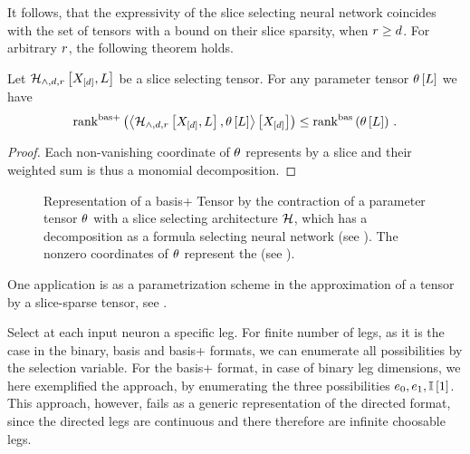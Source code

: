 It follows, that the expressivity of the slice selecting neural network coincides with the set of tensors with a bound on their slice sparsity, when $r\geq d$.
For arbitrary $r$, the following theorem holds.

\begin{theorem}
    Let $\mathcal{H}_{\land,d,r}\left[X_{[d]},L\right]$ be a slice selecting tensor.
    For any parameter tensor $\theta\left[L\right]$ we have
    \[ \mathrm{rank}^{\mathrm{bas+}}\left(\left\langle \mathcal{H}_{\land,d,r}\left[X_{[d]},L\right],\theta\left[L\right]\right\rangle \left[ X_{[d]} \right]\right) \leq \mathrm{rank}^{\mathrm{bas}}\left(\theta\left[L\right]\right) \, . \]
\end{theorem}
\begin{proof}
    Each non-vanishing coordinate of $\theta$ represents by  a slice and their weighted sum is thus a monomial decomposition.
\end{proof}


\begin{figure}[h]
    \begin{center}
        
    \end{center}
    \caption{Representation of a basis+ Tensor by the contraction of a parameter tensor $\theta$ with a slice selecting architecture $\mathcal{H}$, which has a decomposition as a formula selecting neural network (see ).
    The nonzero coordinates of $\theta$ represent the (see ).}
\end{figure}\label{fig:sliceSelectingNN}



One application is as a parametrization scheme in the approximation of a tensor by a slice-sparse tensor, see .



\begin{remark}
    Select at each input neuron a specific leg.
    For finite number of legs, as it is the case in the binary, basis and basis+ formats, we can enumerate all possibilities by the selection variable.
    For the basis+ format, in case of binary leg dimensions, we here exemplified the approach, by enumerating the three possibilities $e_{0},e_{1},\mathbb{I}\left[1\right]$.
    This approach, however, fails as a generic representation of the directed format, since the directed legs are continuous and there therefore are infinite choosable legs.
\end{remark}





